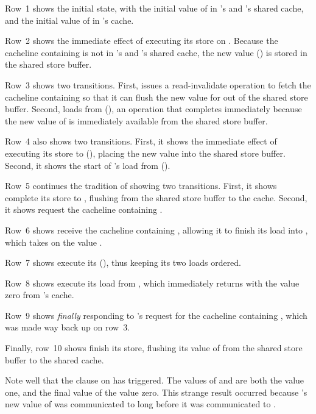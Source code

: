\begin{fcvref}
Row~1 shows the initial state, with the initial value of  in
's and 's shared cache, and the initial value of  in
's cache.

Row~2 shows the immediate effect of  executing its store on .
Because the cacheline containing  is not in 's and 's
shared cache, the new value () is stored in the shared store buffer.

Row~3 shows two transitions.
First,  issues a read-invalidate operation to fetch the cacheline
containing  so that it can flush the new value for  out of
the shared store buffer.
Second,  loads from  (), an operation that completes
immediately because the new value of  is immediately available
from the shared store buffer.

Row~4 also shows two transitions.
First, it shows the immediate effect of  executing its store to
 (), placing the new value into the shared store buffer.
Second, it shows the start of 's load from  ().

Row~5 continues the tradition of showing two transitions.
First, it shows  complete its store to , flushing
from the shared store buffer to the cache.
Second, it shows  request the cacheline containing .

Row~6 shows  receive the cacheline containing , allowing
it to finish its load into , which takes on the value .

Row~7 shows  execute its  (), thus keeping
its two loads ordered.

Row~8 shows  execute its load from , which immediately
returns with the value zero from 's cache.

Row~9 shows  \emph{finally} responding to 's request for
the cacheline containing , which was made way back up on row~3.

Finally, row~10 shows  finish its store, flushing its value of
 from the shared store buffer to the shared cache.

Note well that the  clause on  has triggered.
The values of  and  are both the value one, and
the final value of  the value zero.
This strange result occurred because 's new value of  was
communicated to  long before it was communicated to .
\end{fcvref}

